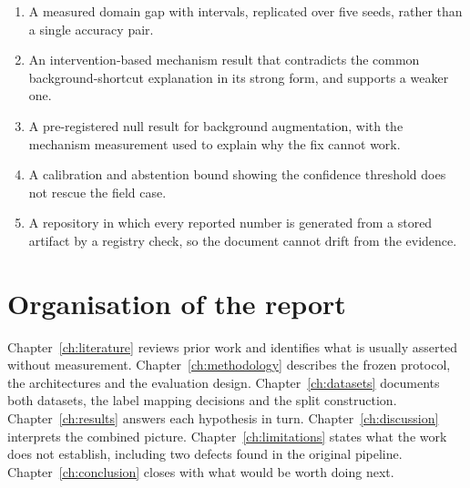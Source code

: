 \begin{enumerate}[leftmargin=1.4em,itemsep=2pt]
\item A measured domain gap with intervals, replicated over five seeds, rather than
      a single accuracy pair.
\item An intervention-based mechanism result that contradicts the common
      background-shortcut explanation in its strong form, and supports a weaker one.
\item A pre-registered null result for background augmentation, with the mechanism
      measurement used to explain why the fix cannot work.
\item A calibration and abstention bound showing the confidence threshold does not
      rescue the field case.
\item A repository in which every reported number is generated from a stored
      artifact by a registry check, so the document cannot drift from the evidence.
\end{enumerate}

\section{Organisation of the report}

Chapter~\ref{ch:literature} reviews prior work and identifies what is usually
asserted without measurement. Chapter~\ref{ch:methodology} describes the frozen
protocol, the architectures and the evaluation design. Chapter~\ref{ch:datasets}
documents both datasets, the label mapping decisions and the split construction.
Chapter~\ref{ch:results} answers each hypothesis in turn. Chapter~\ref{ch:discussion}
interprets the combined picture. Chapter~\ref{ch:limitations} states what the work
does not establish, including two defects found in the original pipeline.
Chapter~\ref{ch:conclusion} closes with what would be worth doing next.
